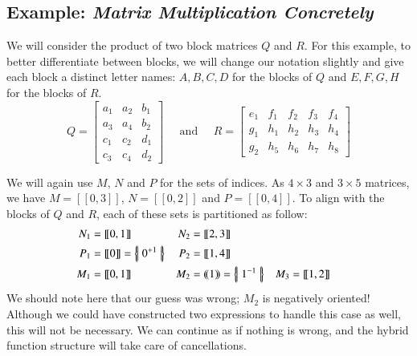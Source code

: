 \subsection{Example: \emph{Matrix Multiplication Concretely}}


We will consider the product of two block matrices $Q$ and $R$.
For this example, to better differentiate between blocks, 
we will change our notation slightly and give each block a distinct letter names: 
$A,B,C,D$ for the blocks of $Q$ and $E,F,G,H$ for the blocks of $R$.
\begin{equation*}
	Q = \left[ \begin{array}{cc|c}
		a_1 & a_2 & b_1 \\
		a_3 & a_4 & b_2 \\
		\hline
		c_1 & c_2 & d_1 \\
		c_3 & c_4 & d_2
	\end{array} \right]
	\;\;\;\;\; \text{and} \;\;\;\;\;
	R = \left[ \begin{array}{c|cccc}
		e_1 & f_1 & f_2 & f_3 & f_4 \\
		\hline
		g_1 & h_1 & h_2 & h_3 & h_4 \\
		g_2 & h_5 & h_6 & h_7 & h_8
	\end{array} \right]
\end{equation*}


We will again use $M$, $N$ and $P$ for the sets of indices.
As $4 \times 3$ and $3\times 5$ matrices, we have $M = [\![0,3]\!]$, $N=[\![0,2]\!]$ and $P=[\![0,4]\!]$.
To align with the blocks of $Q$ and $R$, each of these sets is partitioned as follow:
\begin{align*}
	N_1 	&= [\![0, 1]\!] 	& N_2 	&= [\![2, 3]\!] 	\\
	P_1 	&= [\![0]\!] = \hset{0^{+1}}		& P_2 	&= [\![1, 4]\!] 	\\
	M_1 	&= [\![0, 1]\!] 	& M_2 	&= (\!(1)\!) = \hset{1^{-1}} 	& M_3 	&= [\![1, 2]\!]
\end{align*}
We should note here that our guess was wrong; $M_2$ is negatively oriented!
Although we could have constructed two expressions to handle this case as well, this will not be necessary.
We can continue as if nothing is wrong, and the hybrid function structure will take care of cancellations.


